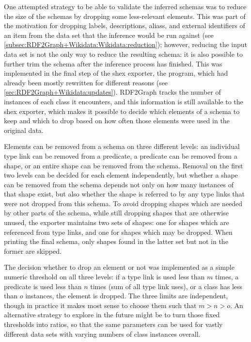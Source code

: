 One attempted strategy to be able to validate the inferred \glspl{schema} %
was to reduce the size of the \glspl{schema} by dropping some less-relevant elements.
This was part of the motivation for dropping \glspl{label}, \glspl{description}, \glspl{alias}, and external identifiers of an \gls{item}
from the data set that the inference would be run against
(see \cref{subsec:RDF2Graph+Wikidata:Wikidata:reduction});
however, reducing the input data set is not the only way to reduce the resulting \gls{schema}:
it is also possible to further trim the \gls{schema} after the inference process has finished.
This was implemented in the final step of the \gls{shex} exporter,
the  program,
which had already been mostly rewritten for different reasons
(see \cref{sec:RDF2Graph+Wikidata:updates}).
\Gls{RDF2Graph} tracks the number of instances of each class it encounters,
and this information is still available to the \gls{shex} exporter,
which makes it possible to decide which elements of a \gls{schema} to keep and which to drop
based on how often those elements were used in the original data. %


Elements can be removed from a \gls{schema} on three different levels:
an individual \gls{type link} can be removed from a \gls{predicate}, %
a \gls{predicate} can be removed from a \gls{shape},
or an entire \gls{shape} can be removed from the \gls{schema}.
Removal on the first two levels can be decided for each element independently,
but whether a \gls{shape} can be removed from the \gls{schema} depends not only on how many instances of that \gls{shape} exist,
but also whether the \gls{shape} is referred to by any \glspl{type link} that were not dropped from this \gls{schema}.
To avoid dropping \glspl{shape} which are needed by other parts of the \gls{schema},
while still dropping \glspl{shape} that are otherwise unused,
the exporter maintains two sets of \glspl{shape}:
one for \glspl{shape} which are referenced from \glspl{type link},
and one for \glspl{shape} which may be dropped.
When printing the final \gls{schema}, only \glspl{shape} found in the latter set but not in the former are skipped.

The decision whether to drop an element or not
was implemented as a simple numeric threshold on all three levels:
if a \gls{type link} is used less than $m$ times,
a \gls{predicate} is used less than $n$ times (sum of all \gls{type link} uses),
or a class has less than $o$ instances,
the element is dropped.
The three limits are independent,
though in practice it makes most sense to choose them such that $m > n > o$.
An alternative strategy to explore in the future might be
to turn those fixed thresholds into ratios,
so that the same parameters can be used for vastly different data sets
with varying numbers of class instances overall.

